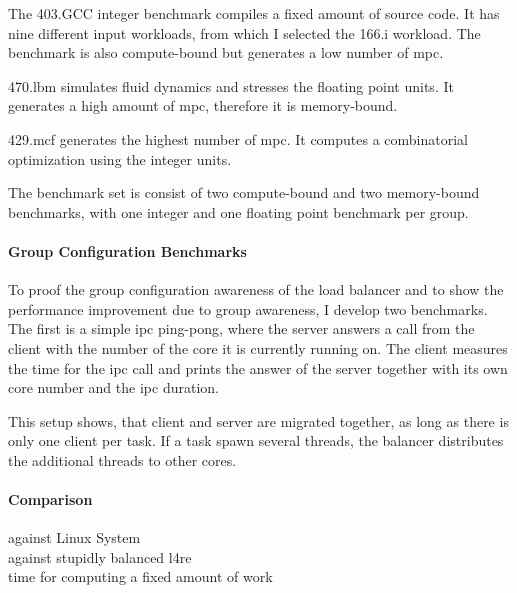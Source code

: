 The 403.GCC integer benchmark compiles a fixed amount of source code.
It has nine different input workloads, from which I selected the 166.i
workload.
The benchmark is also compute-bound but generates a low number of \gls{mpc}.

470.lbm simulates fluid dynamics and stresses the floating point units.
It generates a high amount of \gls{mpc}, therefore it is memory-bound.

429.mcf generates the highest number of \gls{mpc}.
It computes a combinatorial optimization using the integer units.

The benchmark set is consist of two compute-bound and two memory-bound
benchmarks, with one integer and one floating point benchmark per group.

\paragraph{Group Configuration Benchmarks}
To proof the group configuration awareness of the load balancer and to show the
performance improvement due to group awareness, I develop two benchmarks.
The first is a simple \gls{ipc} ping-pong, where the server answers a call from
the client with the number of the core it is currently running on.
The client measures the time for the \gls{ipc} call and prints the answer of
the server together with its own core number and the \gls{ipc} duration.

This setup shows, that client and server are migrated together, as long as
there is only one client per task.
If a task spawn several threads, the balancer distributes the additional
threads to other cores.




\paragraph{Comparison}
  against Linux System \\
  against stupidly balanced l4re \\
  time for computing a fixed amount of work \\



\cleardoublepage

